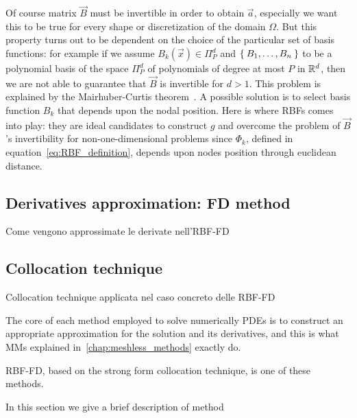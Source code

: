 Of course matrix $\vec{B}$ must be invertible in order to obtain $\vec{a}$, especially we want this to be true for every shape or discretization of the domain $\Omega$. But this property turns out to be dependent on the choice of the particular set of basis functions: for example if we assume $B_k(\vec{x})\in\Pi_P^d$ and $\Set{B_1, \dots, B_n}$ to be a polynomial basis of the space $\Pi_P^d$ of polynomials of degree at most $P$ in $\mathbb{R}^d$, then we are not able to guarantee that $\vec{B}$ is invertible for $d>1$.  This problem is explained by the Mairhuber-Curtis theorem~\cite{Mairhuber:interpolation_basis_problem}. A possible solution is to select basis function  $B_k$ that depends upon the nodal position.
Here is where RBFs comes into play: they are ideal candidates to construct $g$ and overcome the problem of $\vec{B}$'s invertibility for non-one-dimensional problems since $\varPhi_k$, defined in equation~\eqref{eq:RBF_definition}, depends upon nodes position through euclidean distance.

\subsection{Derivatives approximation: FD method}

Come vengono approssimate le derivate nell'RBF-FD

\subsection{Collocation technique}

Collocation technique applicata nel caso concreto delle RBF-FD

The core of each method employed to solve numerically  PDEs is to construct an appropriate approximation for the solution and its derivatives, and this is what MMs explained in~\ref{chap:meshless_methods} exactly do.

RBF-FD, based on the strong form collocation technique, is one of these methods. 

In this section we give a brief description of method 


